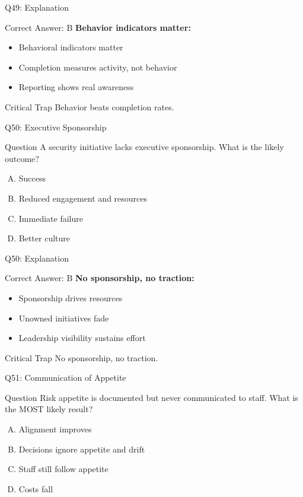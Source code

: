 \documentclass{beamer}
\begin{document}
	\begin{frame}{Q49: Explanation}
		\begin{block}{Correct Answer: B}
			\textbf{Behavior indicators matter:}
			\begin{itemize}
				\item Behavioral indicators matter
				\item Completion measures activity, not behavior
				\item Reporting shows real awareness
			\end{itemize}
		\end{block}
		\begin{alertblock}{Critical Trap}
			Behavior beats completion rates.
		\end{alertblock}
	\end{frame}
	
	\begin{frame}{Q50: Executive Sponsorship}
		\begin{block}{Question}
			A security initiative lacks executive sponsorship. What is the likely outcome?
		\end{block}
		\begin{enumerate}[(A)]
			\item Success
			\item Reduced engagement and resources
			\item Immediate failure
			\item Better culture
		\end{enumerate}
	\end{frame}
	
	\begin{frame}{Q50: Explanation}
		\begin{block}{Correct Answer: B}
			\textbf{No sponsorship, no traction:}
			\begin{itemize}
				\item Sponsorship drives resources
				\item Unowned initiatives fade
				\item Leadership visibility sustains effort
			\end{itemize}
		\end{block}
		\begin{alertblock}{Critical Trap}
			No sponsorship, no traction.
		\end{alertblock}
	\end{frame}
	
	\begin{frame}{Q51: Communication of Appetite}
		\begin{block}{Question}
			Risk appetite is documented but never communicated to staff. What is the MOST likely result?
		\end{block}
		\begin{enumerate}[(A)]
			\item Alignment improves
			\item Decisions ignore appetite and drift
			\item Staff still follow appetite
			\item Costs fall
		\end{enumerate}
	\end{frame}
	
\end{document}
